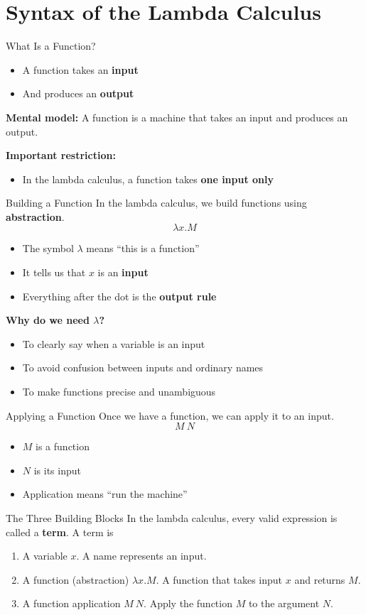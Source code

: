 \documentclass{beamer}
\begin{document}
\section{Syntax of the Lambda Calculus}
\begin{frame}{What Is a Function?}
  \begin{itemize}
    \item A function takes an \textbf{input}
    \item And produces an \textbf{output}
  \end{itemize}
  \textbf{Mental model:} A function is a machine that takes an input and produces an output.

  \textbf{Important restriction:}
  \begin{itemize}\item In the lambda calculus, a function takes \textbf{one input only}\end{itemize}
\end{frame}
\begin{frame}{Building a Function}
  In the lambda calculus, we build functions using \textbf{abstraction}.
  \[\lambda x.M\]
  \begin{itemize}
    \item The symbol $\lambda$ means ``this is a function''
    \item It tells us that $x$ is an \textbf{input}
    \item Everything after the dot is the \textbf{output rule}
  \end{itemize}
  \textbf{Why do we need $\lambda$?}
  \begin{itemize}
    \item To clearly say when a variable is an input
    \item To avoid confusion between inputs and ordinary names
    \item To make functions precise and unambiguous
  \end{itemize}
\end{frame}
\begin{frame}{Applying a Function}
  Once we have a function, we can apply it to an input.
  \[M\ N\]
  \begin{itemize}
    \item $M$ is a function
    \item $N$ is its input
    \item Application means ``run the machine''
  \end{itemize}
\end{frame}
\begin{frame}{The Three Building Blocks}
  In the lambda calculus, every valid expression is called a \textbf{term}. A term is
  \begin{enumerate}
    \item A variable $x$. A name represents an input.
    \item A function (abstraction) $\lambda x.M$. A function that takes input $x$ and returns $M$.
    \item A function application $M\ N$. Apply the function $M$ to the argument $N$.
  \end{enumerate}
\end{frame}
\end{document}
